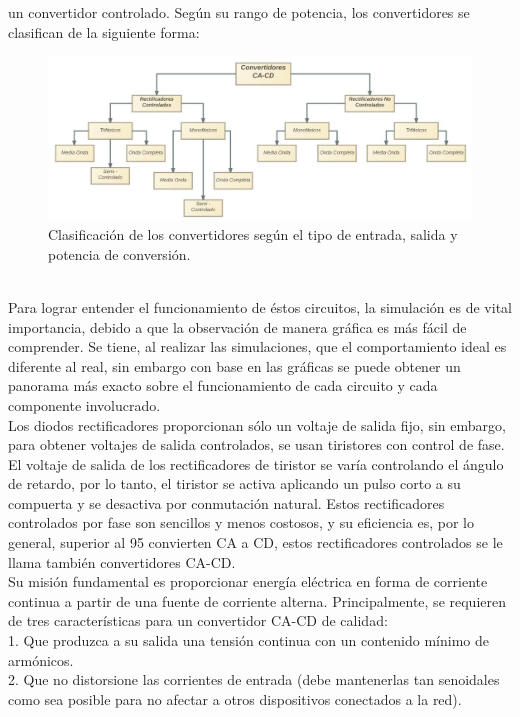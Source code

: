 \documentclass[10pt,a4paper]{article}
\begin{document}
un convertidor controlado.
Según su rango de potencia, los convertidores se clasifican de la siguiente forma:
\begin{figure}[hbtp]
\centering
\includegraphics[scale=0.4]{diagrama.png}
\caption{Clasificación de los convertidores según el tipo de entrada, salida y potencia de
conversión.}
\end{figure}\\
Para lograr entender el funcionamiento de éstos circuitos, la simulación es de vital
importancia, debido a que la observación de manera gráfica es más fácil de comprender.
Se tiene, al realizar las simulaciones, que el comportamiento ideal es diferente al real, sin
embargo con base en las gráficas se puede obtener un panorama más exacto sobre el
funcionamiento de cada circuito y cada componente involucrado.\\
Los diodos rectificadores proporcionan sólo un voltaje de salida fijo, sin embargo, para
obtener voltajes de salida controlados, se usan tiristores con control de fase.
El voltaje de salida de los rectificadores de tiristor se varía controlando el ángulo de
retardo, por lo tanto, el tiristor se activa aplicando un pulso corto a su compuerta y se
desactiva por conmutación natural. Estos rectificadores controlados por fase son sencillos
y menos costosos, y su eficiencia es, por lo general, superior al 95%
convierten CA a CD, estos rectificadores controlados se le llama también convertidores
CA-CD.\\
Su misión fundamental es proporcionar energía eléctrica en forma de corriente continua
a partir de una fuente de corriente alterna.
Principalmente, se requieren de tres características para un convertidor CA-CD de
calidad:\\
1. Que produzca a su salida una tensión continua con un contenido mínimo de
armónicos.\\
2. Que no distorsione las corrientes de entrada (debe mantenerlas tan senoidales
como sea posible para no afectar a otros dispositivos conectados a la red).\\
\end{document}

